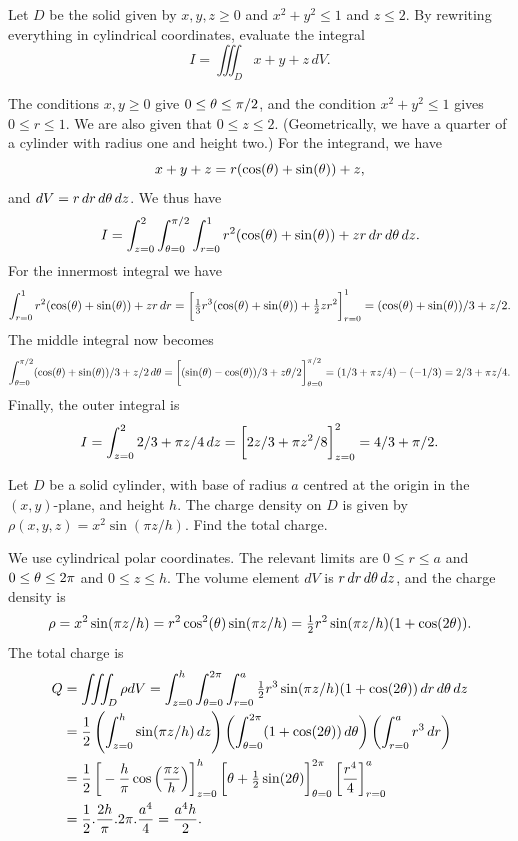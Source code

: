 \documentclass[a4paper]{amsart}
\renewenvironment{solution}{\SolutionInline}{\endSolutionInline}
\begin{document}
\begin{exercise}
 Let $D$ be the solid given by $x,y,z\geq 0$ and $x^2+y^2\leq 1$ and
 $z\leq 2$.  By rewriting everything in cylindrical coordinates,
 evaluate the integral 
 \[ I = \iiint_D x+y+z\, dV. \]
\end{exercise}
\begin{solution}
 The conditions $x,y\geq 0$ give $0\leq\theta\leq\pi/2$, and the
 condition $x^2+y^2\leq 1$ gives $0\leq r\leq 1$.  We are also given
 that $0\leq z\leq 2$.  (Geometrically, we have a quarter of a
 cylinder with radius one and height two.)  For the integrand, we have 
 \[ x+y+z = r(\cos(\theta)+\sin(\theta))+z, \]
 and $dV=r\,dr\,d\theta\,dz$.  We thus have
 \[ I = \int_{z=0}^2\int_{\theta=0}^{\pi/2}\int_{r=0}^1 
          r^2(\cos(\theta)+\sin(\theta))+zr\,dr\,d\theta\,dz.
 \]
 For the innermost integral we have
 \[ \int_{r=0}^1 r^2(\cos(\tht)+\sin(\tht))+zr\,dr = 
     \CH{\tfrac{1}{3}r^3(\cos(\tht)+\sin(\tht))+\tfrac{1}{2}zr^2}_{r=0}^1 =
     (\cos(\tht)+\sin(\tht))/3 + z/2.
 \]
 The middle integral now becomes
 \[ \int_{\tht=0}^{\pi/2} (\cos(\tht)+\sin(\tht))/3 + z/2 \,d\tht = 
    \CH{(\sin(\tht)-\cos(\tht))/3+z\tht/2}_{\tht=0}^{\pi/2} = 
    (1/3+\pi z/4) - (-1/3) = 2/3 + \pi z/4.
 \]
 Finally, the outer integral is 
 \[ I = \int_{z=0}^2 2/3 + \pi z/4\,dz = 
     \CH{2z/3 + \pi z^2/8}_{z=0}^2 = 4/3+\pi/2.
 \]
\end{solution}

\begin{exercise}
 Let $D$ be a solid cylinder, with base of radius $a$ centred at the
 origin in the $(x,y)$-plane, and height $h$.  The charge density on
 $D$ is given by $\rho(x,y,z)=x^2\sin(\pi z/h)$.  Find the total
 charge. 
\end{exercise}
\begin{solution}
 We use cylindrical polar coordinates.  The relevant limits are
 $0\leq r\leq a$ and $0\leq\theta\leq 2\pi$ and $0\leq z\leq h$.  The
 volume element $dV$ is $r\,dr\,d\theta\,dz$, and the charge density is 
 \[ \rho = x^2\sin(\pi z/h) = r^2\cos^2(\theta)\sin(\pi z/h)
     = \tfrac{1}{2} r^2\sin(\pi z/h)(1+\cos(2\theta)).
 \]
 The total charge is
 \begin{align*}
  Q &= \iiint_D \rho dV 
     = \int_{z=0}^h\int_{\tht=0}^{2\pi}\int_{r=0}^a
        \half r^3\sin(\pi z/h)(1+\cos(2\tht)) \,dr\,d\tht\,dz \\
    &= \frac{1}{2}
       \left(\int_{z=0}^h\sin(\pi z/h)\,dz\right)
       \left(\int_{\tht=0}^{2\pi}(1+\cos(2\tht))\,d\tht\right)
       \left(\int_{r=0}^a r^3\,dr\right) \\
    &= \frac{1}{2}
       \CH{-\frac{h}{\pi}\cos\left(\frac{\pi z}{h}\right)}_{z=0}^h
       \CH{\tht+\half\sin(2\tht)}_{\tht=0}^{2\pi} 
       \CH{\frac{r^4}{4}}_{r=0}^a \\
    &= \frac{1}{2} .\frac{2h}{\pi} . 2\pi . \frac{a^4}{4}
     = \frac{a^4h}{2}.
 \end{align*}
\end{solution}
\end{document}
